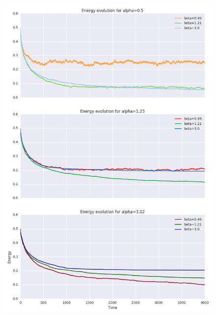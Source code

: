 \documentclass[twocolumn]{article}
\begin{document}
\begin{figure}[!h]
	\includegraphics[width=\columnwidth]{../tobekept/ex1_8526750515376798568-r.png}
\end{figure}

\clearpage
\end{document}
